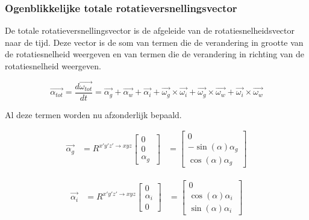 \subsubsection{Ogenblikkelijke totale rotatieversnellingsvector}
De totale rotatieversnellingsvector is de afgeleide van de rotatiesnelheidsvector naar de tijd. Deze vector is de som van termen die de verandering in grootte van de rotatiesnelheid weergeven en van termen die de verandering in richting van de rotatiesnelheid weergeven.

\begin{equation*}
\overrightarrow{\alpha_{tot}}=\frac{d\overrightarrow{\omega_{tot}}}{dt}=\overrightarrow{\alpha_{g}}+\overrightarrow{\alpha_{w}}+\overrightarrow{\alpha_{i}}+\overrightarrow{\omega_{g}}\times\overrightarrow{\omega_{i}}+\overrightarrow{\omega_{g}}\times\overrightarrow{\omega_{w}}+\overrightarrow{\omega_{i}}\times\overrightarrow{\omega_{w}}
\end{equation*}

Al deze termen worden nu afzonderlijk bepaald.

\begin{equation*}
\begin{split}
\overrightarrow{\alpha_{g}}&=R^{x'y'z' \rightarrow xyz}
	\begin{bmatrix}
	0\\
	0\\
	\alpha_{g}\
	\end{bmatrix}
	&=\begin{bmatrix}
	0\\
	-\sin(\alpha)\alpha_{g}\\
	\cos(\alpha)\alpha_{g}\
	\end{bmatrix}
\end{split}
\end{equation*}

\begin{equation*}
\begin{split}
\overrightarrow{\alpha_{i}}&=R^{x'y'z' \rightarrow xyz}
	\begin{bmatrix}
	0\\
	\alpha_{i}\\
	0\
	\end{bmatrix}
	&=\begin{bmatrix}
	0\\
	\cos(\alpha)\alpha_{i}\\
	\sin(\alpha)\alpha_{i}\
	\end{bmatrix}
\end{split}
\end{equation*}

